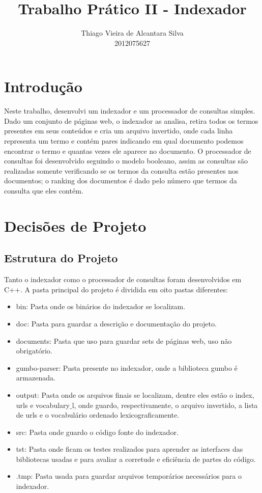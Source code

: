 \documentclass[11pt]{article}
\title{\textbf{Trabalho Prático II - Indexador}}
\author{Thiago Vieira de Alcantara Silva\\2012075627}
\date{}
\begin{document}
\maketitle

\section{Introdução}
Neste trabalho, desenvolvi um indexador e um processador de consultas simples. Dado um conjunto de páginas web, o indexador as analisa, retira todos os termos presentes em seus conteúdos e cria um arquivo invertido, onde cada linha representa um termo e contém pares indicando em qual documento podemos encontrar o termo e quantas vezes ele aparece no documento. O processador de consultas foi desenvolvido seguindo o modelo booleano, assim as consultas são realizadas somente verificando se os termos da consulta estão presentes nos documentos; o ranking dos documentos é dado pelo número que termos da consulta que eles contém.

\section{Decisões de Projeto}
\subsection{Estrutura do Projeto}
Tanto o indexador como o processador de consultas foram desenvolvidos em C++.
A pasta principal do projeto é dividida em oito pastas diferentes:
\begin{itemize}
\item bin: Pasta onde os binários do indexador se localizam.
\item doc: Pasta para guardar a descrição e documentação do projeto.
\item documents: Pasta que uso para guardar sets de páginas web, uso não obrigatório.
\item gumbo-parser: Pasta presente no indexador, onde a biblioteca gumbo é armazenada.
\item output: Pasta onde os arquivos finais se localizam, dentre eles estão o index, urls e vocabulary$\_$l, onde guardo, respectivamente, o arquivo invertido, a lista de urls e o vocabulário ordenado lexicograficamente.
\item src: Pasta onde guardo o código fonte do indexador.
\item tst: Pasta onde ficam os testes realizados para aprender as interfaces das bibliotecas usadas e para avaliar a corretude e eficiência de partes do código.
\item .tmp: Pasta usada para guardar arquivos temporários necessários para o indexador.
\end{itemize}
\end{document}
